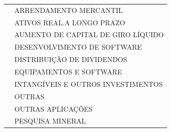 \documentclass{article}
\begin{document}
\begin{longtable}[c]{m{1cm}m{1cm}m{1cm}m{8cm}}
& \multicolumn{3}{L{10cm}}{ARRENDAMENTO MERCANTIL} \\
& \multicolumn{3}{L{10cm}}{ATIVOS REAL.A LONGO PRAZO} \\
& \multicolumn{3}{L{10cm}}{AUMENTO DE CAPITAL DE GIRO LÍQUIDO} \\
& \multicolumn{3}{L{10cm}}{DESENVOLVIMENTO DE SOFTWARE} \\
& \multicolumn{3}{L{10cm}}{DISTRIBUIÇÃO DE DIVIDENDOS} \\
& \multicolumn{3}{L{10cm}}{EQUIPAMENTOS E SOFTWARE} \\
& \multicolumn{3}{L{10cm}}{INTANGÍVEIS E OUTROS INVESTIMENTOS} \\
& \multicolumn{3}{L{10cm}}{OUTRAS} \\
& \multicolumn{3}{L{10cm}}{OUTRAS APLICAÇÕES} \\
& \multicolumn{3}{L{10cm}}{PESQUISA MINERAL} \\
\end{longtable}
% 
\end{document}
